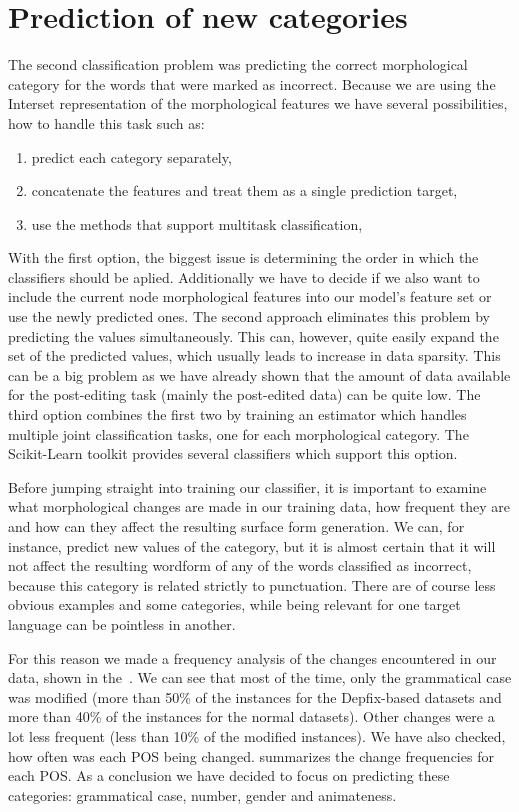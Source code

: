 \section{Prediction of new categories}

The second classification problem was predicting the correct morphological category for
the words that were marked as incorrect. Because we are using the Interset representation
of the morphological features we have several possibilities, how to handle this task such
as:
\begin{enumerate}
    \item predict each category separately,
    \item concatenate the features and treat them as a single prediction target,
    \item use the methods that support multitask classification,
\end{enumerate}

With the first option, the biggest issue is determining the order in which the classifiers
should be aplied. Additionally we have to decide if we also want to include the current node morphological features
into our model's feature set or use the newly predicted ones. The second approach eliminates this problem by predicting the
values simultaneously. This can, however, quite easily expand the set of the predicted values,
which usually leads to increase in data sparsity. This can be a big problem as we have
already shown that the amount of data available for the post-editing task (mainly the post-edited
data) can be quite low. The third option combines the first two by training an estimator
which handles multiple joint classification tasks, one for each morphological category. The
Scikit-Learn toolkit provides several classifiers which support this option.

Before jumping straight into training our classifier, it is important to examine what morphological
changes are made in our training data, how frequent they are and how can they affect the resulting
surface form generation. We can, for instance, predict new values of the  category,
but it is almost certain that it will not affect the resulting wordform of any of the words
classified as incorrect, because this category is related strictly to punctuation. There are
of course less obvious examples and some categories, while being relevant for one target language
can be pointless in another.

For this reason we made a frequency analysis of the changes encountered
in our data, shown in the~. We can see that most of the time, only the grammatical
case was modified (more than 50\% of the instances for the Depfix-based datasets and more than 40\% of the instances for
the normal datasets). Other changes were a lot less frequent (less than 10\% of the modified instances).
We have also checked, how often was each POS being changed.  summarizes the change frequencies for each
POS. As a conclusion we have decided to focus on predicting these categories: grammatical case, number, gender
and animateness.

